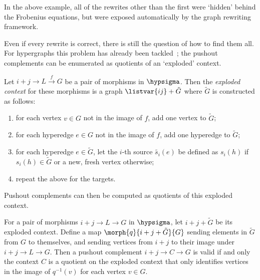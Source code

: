 In the above example, all of the rewrites other than the first were `hidden'
behind the Frobenius equations, but were exposed automatically by the graph
rewriting framework.

Even if every rewrite is correct, there is still the question of how to find
them all.
For hypergraphs this problem has already been
tackled~\cite{heumuller2011construction}; the pushout complements can be
enumerated as quotients of an `exploded' context.

\begin{definition}
    Let \(i+j \to L \xrightarrow{f} G\) be a pair of morphisms in
    \(\hypsigma\).
    Then the \emph{exploded context} for these morphisms is a graph
    \(\listvar{ij} + \tilde{G}\) where \(\tilde{G}\) is constructed as follows:
    \begin{enumerate}
        \item for each vertex \(v \in G\) not in the image of \(f\), add one
              vertex to \(\tilde{G}\);
        \item for each hyperedge \(e \in G\) not in the image of \(f\), add one
              hyperedge to \(\tilde{G}\);
        \item for each hyperedge \(e \in \tilde{G}\), let the \(i\)-th source
              \(\tilde{s_i}(e)\) be defined as \(s_i(h)\) if
              \(s_i(h) \in \tilde{G}\) or a new, fresh vertex otherwise;
        \item repeat the above for the targets.
    \end{enumerate}
\end{definition}

Pushout complements can then be computed as quotients of this exploded
context.

\begin{proposition}
    For a pair of morphisms \(i+j \to L \to G\) in \(\hypsigma\), let
    \(i + j + \tilde{G}\) be its exploded context.
    Define a map \(\morph{q}{i + j + \tilde{G}}{G}\) sending elements in
    \(\tilde{G}\) from \(G\) to themselves, and sending vertices from
    \(i + j\) to their image under \(i + j \to L \to G\).
    Then a pushout complement \(i + j \to C \to G\) is valid if and only the
    context \(C\) is a quotient on the exploded context that only identifies
    vertices in the image of \(q^{-1}(v)\) for each vertex \(v \in G\).
\end{proposition}

